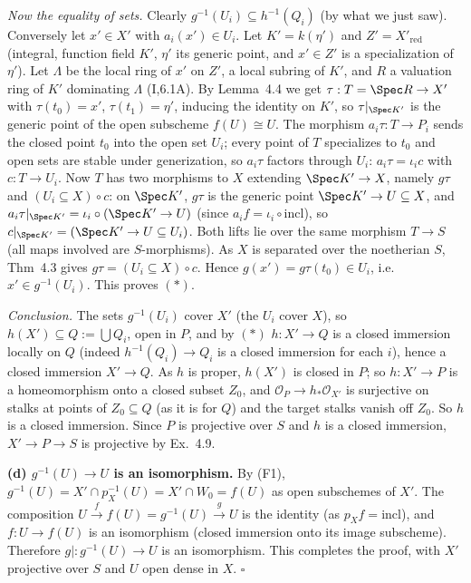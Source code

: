 \documentclass[11pt]{article}
\begin{document}
\emph{Now the equality of sets.} Clearly $g^{-1}(U_i)\subseteq h^{-1}(Q_i)$ (by what we just saw). Conversely let $x'\in X'$ with $a_i(x')\in U_i$. Let $K'=k(\eta')$ and $Z'=X'_{\mathrm{red}}$ (integral, function field $K'$, $\eta'$ its generic point, and $x'\in Z'$ is a specialization of $\eta'$). Let $\Lambda$ be the local ring of $x'$ on $Z'$, a local subring of $K'$, and $R$ a valuation ring of $K'$ dominating $\Lambda$ (I,6.1A). By Lemma~4.4 we get $\tau:T=\Spec R\to X'$ with $\tau(t_0)=x'$, $\tau(t_1)=\eta'$, inducing the identity on $K'$, so $\tau|_{\Spec K'}$ is the generic point of the open subscheme $f(U)\cong U$. The morphism $a_i\tau:T\to P_i$ sends the closed point $t_0$ into the open set $U_i$; every point of $T$ specializes to $t_0$ and open sets are stable under generization, so $a_i\tau$ factors through $U_i$: $a_i\tau=\iota_ic$ with $c:T\to U_i$. Now $T$ has two morphisms to $X$ extending $\Spec K'\to X$, namely $g\tau$ and $(U_i\subseteq X)\circ c$: on $\Spec K'$, $g\tau$ is the generic point $\Spec K'\to U\subseteq X$, and $a_i\tau|_{\Spec K'}=\iota_i\circ(\Spec K'\to U)$ (since $a_if=\iota_i\circ\mathrm{incl}$), so $c|_{\Spec K'}=(\Spec K'\to U\subseteq U_i)$. Both lifts lie over the same morphism $T\to S$ (all maps involved are $S$-morphisms). As $X$ is separated over the noetherian $S$, Thm~4.3 gives $g\tau=(U_i\subseteq X)\circ c$. Hence $g(x')=g\tau(t_0)\in U_i$, i.e.\ $x'\in g^{-1}(U_i)$. This proves $(\ast)$.

\emph{Conclusion.} The sets $g^{-1}(U_i)$ cover $X'$ (the $U_i$ cover $X$), so $h(X')\subseteq Q:=\bigcup Q_i$, open in $P$, and by $(\ast)$ $h:X'\to Q$ is a closed immersion locally on $Q$ (indeed $h^{-1}(Q_i)\to Q_i$ is a closed immersion for each $i$), hence a closed immersion $X'\to Q$. As $h$ is proper, $h(X')$ is closed in $P$; so $h:X'\to P$ is a homeomorphism onto a closed subset $Z_0$, and $\mathcal O_P\to h_*\mathcal O_{X'}$ is surjective on stalks at points of $Z_0\subseteq Q$ (as it is for $Q$) and the target stalks vanish off $Z_0$. So $h$ is a closed immersion. Since $P$ is projective over $S$ and $h$ is a closed immersion, $X'\to P\to S$ is projective by Ex.~4.9.

\textbf{(d) $g^{-1}(U)\to U$ is an isomorphism.} By (F1), $g^{-1}(U)=X'\cap p_X^{-1}(U)=X'\cap W_0=f(U)$ as open subschemes of $X'$. The composition $U\xrightarrow{f}f(U)=g^{-1}(U)\xrightarrow{g}U$ is the identity (as $p_Xf=\mathrm{incl}$), and $f:U\to f(U)$ is an isomorphism (closed immersion onto its image subscheme). Therefore $g|:g^{-1}(U)\to U$ is an isomorphism. This completes the proof, with $X'$ projective over $S$ and $U$ open dense in $X$. \hfill$\square$
\end{document}
